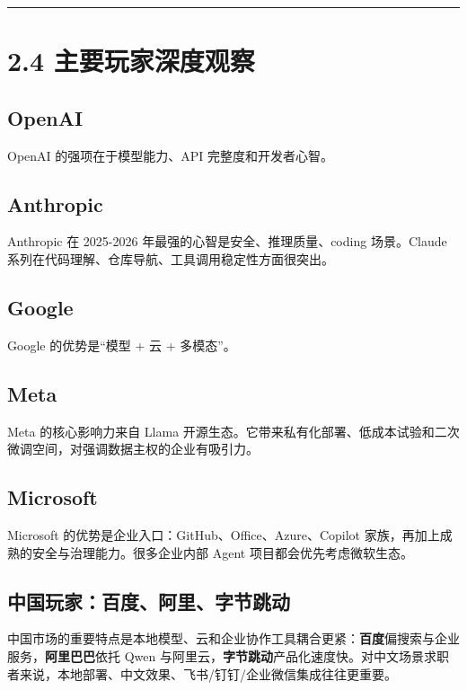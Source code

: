 \bigskip\hrule\bigskip

\section{2.4 主要玩家深度观察}

\subsection{OpenAI}

OpenAI 的强项在于模型能力、API 完整度和开发者心智。


\subsection{Anthropic}

Anthropic 在 2025-2026 年最强的心智是安全、推理质量、coding 场景。Claude 系列在代码理解、仓库导航、工具调用稳定性方面很突出。


\subsection{Google}

Google 的优势是``模型 + 云 + 多模态''。


\subsection{Meta}

Meta 的核心影响力来自 Llama 开源生态。它带来私有化部署、低成本试验和二次微调空间，对强调数据主权的企业有吸引力。


\subsection{Microsoft}

Microsoft 的优势是企业入口：GitHub、Office、Azure、Copilot 家族，再加上成熟的安全与治理能力。很多企业内部 Agent 项目都会优先考虑微软生态。


\subsection{中国玩家：百度、阿里、字节跳动}

中国市场的重要特点是本地模型、云和企业协作工具耦合更紧：\textbf{百度}偏搜索与企业服务，\textbf{阿里巴巴}依托 Qwen 与阿里云，\textbf{字节跳动}产品化速度快。对中文场景求职者来说，本地部署、中文效果、飞书/钉钉/企业微信集成往往更重要。


